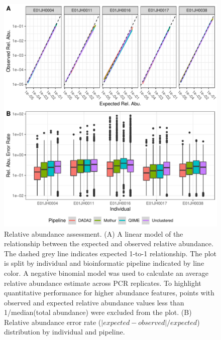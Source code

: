 \documentclass[linenumbers]{bmcart}
\begin{document}
\begin{figure}
\centering
\includegraphics{relAbuError-1.pdf}
\caption{\label{fig:relAbuError}Relative abundance assessment.
(A) A linear model of the relationship between the expected and observed relative
abundance. The dashed grey line indicates expected 1-to-1 relationship.
The plot is split by individual and bioinformatic pipeline indicated by
line color. A negative binomial model was used to
calculate an average relative abundance estimate across PCR
replicates. To highlight quantitative performance for higher abundance features,
points with observed and expected relative abundance values less
than 1/median(total abundance) were excluded from the plot.
(B) Relative abundance error rate (\(|expected - observed|/expected\))
distribution by individual and pipeline.}
\end{figure}
\end{document}
